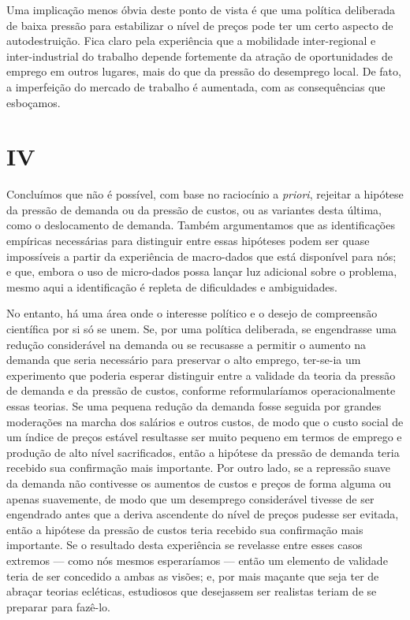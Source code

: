 \documentclass[12pt]{article}
\begin{document}
Uma implicação menos óbvia deste ponto de vista é que uma política deliberada de baixa pressão para estabilizar o nível de preços pode ter um certo aspecto de autodestruição. Fica claro pela experiência que a mobilidade inter-regional e inter-industrial do trabalho depende fortemente da atração de oportunidades de emprego em outros lugares, mais do que da pressão do desemprego local. De fato, a imperfeição do mercado de trabalho é aumentada, com as consequências que esboçamos.

\section*{IV}

Concluímos que não é possível, com base no raciocínio a \textit{priori}, rejeitar a hipótese da pressão de demanda ou da pressão de custos, ou as variantes desta última, como o deslocamento de demanda. Também argumentamos que as identificações empíricas necessárias para distinguir entre essas hipóteses podem ser quase impossíveis a partir da experiência de macro-dados que está disponível para nós; e que, embora o uso de micro-dados possa lançar luz adicional sobre o problema, mesmo aqui a identificação é repleta de dificuldades e ambiguidades.

No entanto, há uma área onde o interesse político e o desejo de compreensão científica por si só se unem. Se, por uma política deliberada, se engendrasse uma redução considerável na demanda ou se recusasse a permitir o aumento na demanda que seria necessário para preservar o alto emprego, ter-se-ia um experimento que poderia esperar distinguir entre a validade da teoria da pressão de demanda e da pressão de custos, conforme reformularíamos operacionalmente essas teorias. Se uma pequena redução da demanda fosse seguida por grandes moderações na marcha dos salários e outros custos, de modo que o custo social de um índice de preços estável resultasse ser muito pequeno em termos de emprego e produção de alto nível sacrificados, então a hipótese da pressão de demanda teria recebido sua confirmação mais importante. Por outro lado, se a repressão suave da demanda não contivesse os aumentos de custos e preços de forma alguma ou apenas suavemente, de modo que um desemprego considerável tivesse de ser engendrado antes que a deriva ascendente do nível de preços pudesse ser evitada, então a hipótese da pressão de custos teria recebido sua confirmação mais importante. Se o resultado desta experiência se revelasse entre esses casos extremos — como nós mesmos esperaríamos — então um elemento de validade teria de ser concedido a ambas as visões; e, por mais maçante que seja ter de abraçar teorias ecléticas, estudiosos que desejassem ser realistas teriam de se preparar para fazê-lo.
\end{document}
